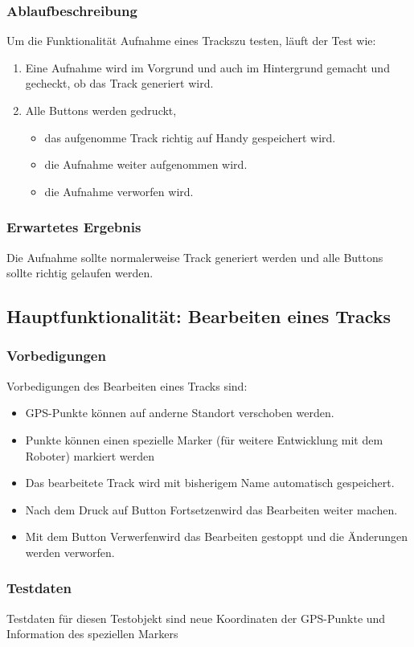 \documentclass{article}
\begin{document}
\subsubsection{Ablaufbeschreibung}
	Um die Funktionalität \glqq Aufnahme eines Tracks\grqq zu testen, läuft der Test wie:
	\begin{enumerate}
		\item Eine Aufnahme wird im Vorgrund und auch im Hintergrund gemacht und gecheckt, ob das Track generiert wird.
		\item Alle Buttons werden gedruckt,
			\begin{itemize}
				\item das aufgenomme Track richtig auf Handy gespeichert wird.
				\item die Aufnahme weiter aufgenommen wird.
				\item die Aufnahme verworfen wird.
			\end{itemize}
	\end{enumerate}
\subsubsection{Erwartetes Ergebnis}
	Die Aufnahme sollte normalerweise Track generiert werden und alle Buttons sollte richtig gelaufen werden.

\subsection{Hauptfunktionalität: Bearbeiten eines Tracks}
\subsubsection{Vorbedigungen}
	Vorbedigungen des Bearbeiten eines Tracks sind:
	\begin{itemize}
		\item GPS-Punkte können auf anderne Standort verschoben werden.
		\item Punkte können einen spezielle Marker (für weitere Entwicklung mit dem Roboter) markiert werden
		\item Das bearbeitete Track wird mit bisherigem Name automatisch gespeichert.
		\item Nach dem Druck auf Button \glqq Fortsetzen\grqq wird das Bearbeiten weiter machen.
		\item Mit dem Button \glqq Verwerfen\grqq wird das Bearbeiten gestoppt und die Änderungen werden verworfen.		
	\end{itemize}
\subsubsection{Testdaten}
	Testdaten für diesen Testobjekt sind neue Koordinaten der GPS-Punkte und Information des speziellen Markers
\end{document}
